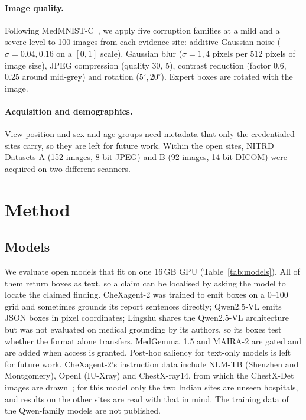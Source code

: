 \documentclass[pdflatex,sn-mathphys-num]{sn-jnl}
\theoremstyle{thmstyleone}
\begin{document}
\paragraph{Image quality.} Following MedMNIST-C~\cite{medmnistc}, we apply five corruption families at a mild and a severe level to 100 images from each evidence site: additive Gaussian noise ($\sigma=0.04, 0.16$ on a $[0,1]$ scale), Gaussian blur ($\sigma=1, 4$ pixels per 512 pixels of image size), JPEG compression (quality 30, 5), contrast reduction (factor 0.6, 0.25 around mid-grey) and rotation ($5^\circ, 20^\circ$). Expert boxes are rotated with the image.

\paragraph{Acquisition and demographics.} View position and sex and age groups need metadata that only the credentialed sites carry, so they are left for future work. Within the open sites, NITRD Datasets A (152 images, 8-bit JPEG) and B (92 images, 14-bit DICOM) were acquired on two different scanners.

\section{Method}\label{sec:method}

\subsection{Models}\label{sec:models}

We evaluate open models that fit on one 16\,GB GPU (Table~\ref{tab:models}). All of them return boxes as text, so a claim can be localised by asking the model to locate the claimed finding. CheXagent-2 was trained to emit boxes on a $0$--$100$ grid and sometimes grounds its report sentences directly; Qwen2.5-VL emits JSON boxes in pixel coordinates; Lingshu shares the Qwen2.5-VL architecture but was not evaluated on medical grounding by its authors, so its boxes test whether the format alone transfers. MedGemma~1.5 and MAIRA-2 are gated and are added when access is granted. Post-hoc saliency for text-only models is left for future work. CheXagent-2's instruction data include NLM-TB (Shenzhen and Montgomery), OpenI (IU-Xray) and ChestX-ray14, from which the ChestX-Det images are drawn~\cite{chexagent}; for this model only the two Indian sites are unseen hospitals, and results on the other sites are read with that in mind. The training data of the Qwen-family models are not published.
\end{document}
